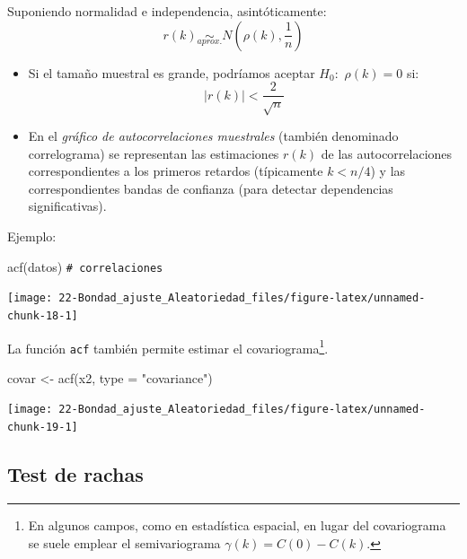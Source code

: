 \documentclass[
]{book}
\newenvironment{Shaded}{\begin{snugshade}}{\end{snugshade}}
\newcommand{\AttributeTok}[1]{\textcolor[rgb]{0.77,0.63,0.00}{#1}}
\newcommand{\CommentTok}[1]{\textcolor[rgb]{0.56,0.35,0.01}{\textit{#1}}}
\newcommand{\FunctionTok}[1]{\textcolor[rgb]{0.00,0.00,0.00}{#1}}
\newcommand{\NormalTok}[1]{#1}
\newcommand{\OtherTok}[1]{\textcolor[rgb]{0.56,0.35,0.01}{#1}}
\newcommand{\StringTok}[1]{\textcolor[rgb]{0.31,0.60,0.02}{#1}}
\theoremstyle{break}
\theoremstyle{nonumberplain}
\renewcommand{\CommentTok}[1]{\textcolor[rgb]{0.41,0.41,0.41}{\texttt{#1}}}
\begin{document}
Suponiendo normalidad e independencia, asintóticamente:
\[r(k)\underset{aprox.}{\sim}N\left(  \rho(k),\frac{1}{n}\right)\]

\begin{itemize}
\item
  Si el tamaño muestral es grande, podríamos aceptar \(H_{0}:\)
  \(\rho\left( k\right) = 0\) si:\[|r(k)|<\dfrac{2}{\sqrt{n}}\]
\item
  En el \emph{gráfico de autocorrelaciones muestrales} (también
  denominado correlograma) se representan las estimaciones \(r(k)\)
  de las autocorrelaciones correspondientes a los primeros retardos
  (típicamente \(k<n/4\)) y las correspondientes bandas de confianza
  (para detectar dependencias significativas).
\end{itemize}

Ejemplo:

\begin{Shaded}
\begin{Highlighting}[]
\FunctionTok{acf}\NormalTok{(datos)  }\CommentTok{\# correlaciones}
\end{Highlighting}
\end{Shaded}

\begin{center}\texttt{[image: 22-Bondad\_ajuste\_Aleatoriedad\_files/figure-latex/unnamed-chunk-18-1]} \end{center}

La función \texttt{acf} también permite estimar el covariograma\footnote{En algunos campos, como en estadística espacial, en lugar del covariograma se suele emplear el semivariograma \(\gamma(k) = C(0) - C(k)\).}.

\begin{Shaded}
\begin{Highlighting}[]
\NormalTok{covar }\OtherTok{\textless{}{-}} \FunctionTok{acf}\NormalTok{(x2, }\AttributeTok{type =} \StringTok{"covariance"}\NormalTok{)}
\end{Highlighting}
\end{Shaded}

\begin{center}\texttt{[image: 22-Bondad\_ajuste\_Aleatoriedad\_files/figure-latex/unnamed-chunk-19-1]} \end{center}

\hypertarget{test-de-rachas}{%
\subsection{Test de rachas}\label{test-de-rachas}}
\end{document}
